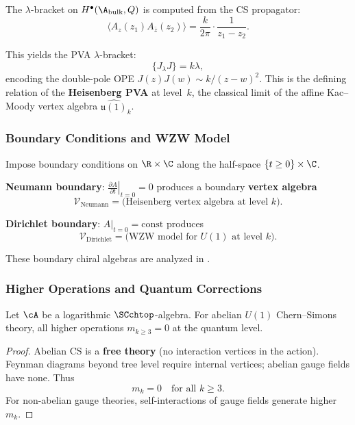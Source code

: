 The $\lambda$-bracket on $H^\bullet(\A_{\text{bulk}}, Q)$ is computed from the CS propagator:
\begin{equation}
\langle A_z(z_1) A_{\bar{z}}(z_2) \rangle = \frac{k}{2\pi} \cdot \frac{1}{z_1 - z_2}.
\end{equation}

This yields the PVA $\lambda$-bracket:
\begin{equation}
\{J_\lambda J\} = k\lambda,
\end{equation}
encoding the double-pole OPE $J(z)J(w) \sim k/(z-w)^2$.
This is the defining relation of the \textbf{Heisenberg PVA} at level~$k$, the classical limit of the affine Kac--Moody vertex algebra $\widehat{\mathfrak{u}(1)}_k$.

\subsubsection{Boundary Conditions and WZW Model}

Impose boundary conditions on $\R \times \C$ along the half-space $\{t \geq 0\} \times \C$.

\textbf{Neumann boundary}: $\left. \frac{\partial A}{\partial t} \right|_{t=0} = 0$ produces a boundary \textbf{vertex algebra}
\begin{equation}
\mathcal{V}_{\text{Neumann}} = \text{(Heisenberg vertex algebra at level $k$)}.
\end{equation}

\textbf{Dirichlet boundary}: $A|_{t=0} = \text{const}$ produces
\begin{equation}
\mathcal{V}_{\text{Dirichlet}} = \text{(WZW model for $U(1)$ at level $k$)}.
\end{equation}

These boundary chiral algebras are analyzed in \cite{CDG20}.

\subsubsection{Higher Operations and Quantum Corrections}

\begin{proposition}
Let\/ $\cA$ be a logarithmic\/ $\SCchtop$-algebra.
For abelian $U(1)$ Chern--Simons theory, all higher operations $m_{k \geq 3} = 0$ at the quantum level.
\end{proposition}

\begin{proof}
Abelian CS is a \textbf{free theory} (no interaction vertices in the action). Feynman diagrams beyond tree level require internal vertices; abelian gauge fields have none. Thus
\begin{equation}
m_k = 0 \quad \text{for all } k \geq 3.
\end{equation}
For non-abelian gauge theories, self-interactions of gauge fields generate higher $m_k$.
\end{proof}

